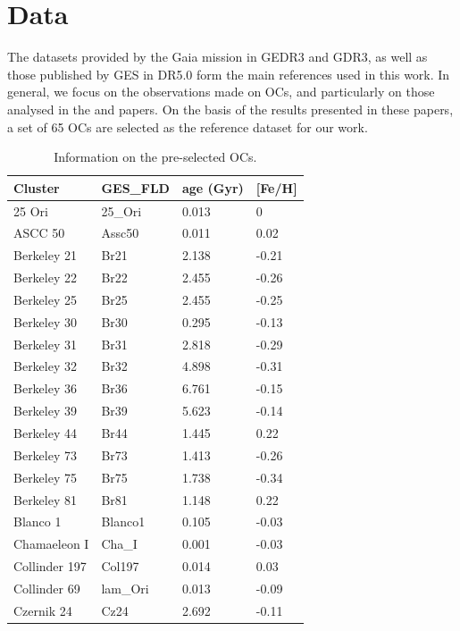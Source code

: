 \documentclass[fleqn,usenatbib]{mnras}
\begin{document}
\section{Data} \label{sec_method}
The datasets provided by the Gaia mission in GEDR3 and GDR3, as well as those published by GES in DR5.0 form the main references used in this work. In general, we focus on the observations made on OCs, and particularly on those analysed in the \cite{Bragaglia2022} and \cite{Randich2022} papers. On the basis of the results presented in these papers, a set of 65 OCs are selected as the reference dataset for our work. 

\begin{table}
	\centering
	\caption{Information on the pre-selected OCs.}
	\label{tab:oc_list}
	\begin{tabular}{l l l l} 
		\hline
		Cluster & GES\_FLD & age (Gyr) & [Fe/H]\\
		\hline
            25 Ori & 25\_Ori & 0.013 & 0 \\
            ASCC 50 & Assc50 & 0.011 & 0.02 \\
            Berkeley 21 & Br21 & 2.138 & -0.21 \\
            Berkeley 22 & Br22 & 2.455 & -0.26 \\
            Berkeley 25 & Br25 & 2.455 & -0.25 \\
            Berkeley 30 & Br30 & 0.295 & -0.13 \\
            Berkeley 31 & Br31 & 2.818 & -0.29 \\
            Berkeley 32 & Br32 & 4.898 & -0.31 \\
            Berkeley 36 & Br36 & 6.761 & -0.15 \\
            Berkeley 39 & Br39 & 5.623 & -0.14 \\
            Berkeley 44 & Br44 & 1.445 & 0.22 \\
            Berkeley 73 & Br73 & 1.413 & -0.26 \\
            Berkeley 75 & Br75 & 1.738 & -0.34 \\
            Berkeley 81 & Br81 & 1.148 & 0.22 \\
            Blanco 1 & Blanco1 & 0.105 & -0.03 \\
            Chamaeleon I & Cha\_I & 0.001 & -0.03 \\
            Collinder 197 & Col197 & 0.014 & 0.03 \\
            Collinder 69 & lam\_Ori & 0.013 & -0.09 \\
            Czernik 24 & Cz24 & 2.692 & -0.11 \\

\end{tabular}
\end{table}
\end{document}
